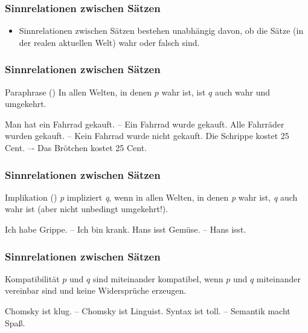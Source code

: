 \begin{frame}
\frametitle{Sinnrelationen zwischen Sätzen}

\begin{itemize}
	\item Sinnrelationen zwischen Sätzen bestehen unabhängig davon, ob die Sätze (in der realen aktuellen Welt) wahr oder falsch sind.
\end{itemize}

\end{frame}


\begin{frame}
\frametitle{Sinnrelationen zwischen Sätzen}

\begin{block}{Paraphrase ()}
In allen Welten, in denen $p$ wahr ist, ist $q$ auch wahr und umgekehrt.
\end{block}


	\eal 
		\ex Man hat ein Fahrrad gekauft. -- Ein Fahrrad wurde gekauft.
		\ex Alle Fahrräder wurden gekauft. -- Kein Fahrrad wurde nicht gekauft.
		\ex Die Schrippe kostet 25 Cent. –- Das Brötchen kostet 25 Cent.
	\zl
		
\end{frame}


\begin{frame}
\frametitle{Sinnrelationen zwischen Sätzen}

\begin{block}{Implikation ()}
\textit{p} impliziert \textit{q}, wenn in allen Welten, in denen \textit{p} wahr ist, \textit{q} auch wahr ist (aber nicht unbedingt umgekehrt!).
\end{block}
		
\eal 
	\ex Ich habe Grippe. -- Ich bin krank.
	\ex Hans isst Gemüse. -- Hans isst.
\zl

\end{frame}


\begin{frame}
\frametitle{Sinnrelationen zwischen Sätzen}

\begin{block}{Kompatibilität}
$p$ und $q$ sind miteinander kompatibel, wenn $p$ und $q$ miteinander vereinbar sind und keine Widersprüche erzeugen.
\end{block}

		\eal 
			\ex Chomsky ist klug. -- Chomsky ist Linguist.
			\ex Syntax ist toll. -- Semantik macht Spa\ss{}.
		\zl
		
\end{frame}


